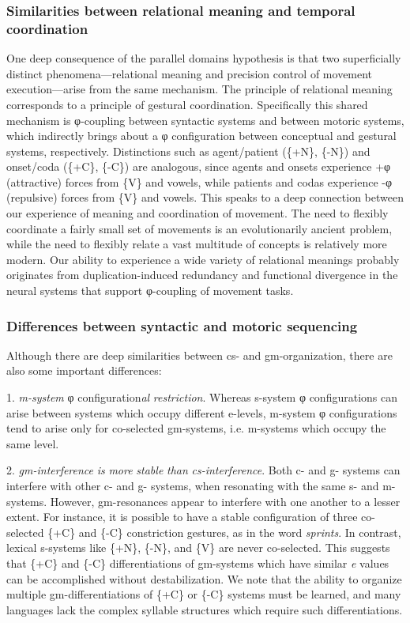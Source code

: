 \subsubsection{Similarities between relational meaning and temporal coordination}

One deep consequence of the parallel domains hypothesis is that two superficially distinct phenomena—relational meaning and precision control of movement execution—arise from the same mechanism. The principle of relational meaning corresponds to a principle of gestural coordination. Specifically this shared mechanism is φ-coupling between syntactic systems and between motoric systems, which indirectly brings about a φ configuration between conceptual and gestural systems, respectively. Distinctions such as agent/patient (\{+N\}, \{-N\}) and onset/coda (\{+C\}, \{-C\}) are analogous, since agents and onsets experience +φ (attractive) forces from \{V\} and vowels, while patients and codas experience -φ (repulsive) forces from \{V\} and vowels. This speaks to a deep connection between our experience of meaning and coordination of movement. The need to flexibly coordinate a fairly small set of movements is an evolutionarily ancient problem, while the need to flexibly relate a vast multitude of concepts is relatively more modern. Our ability to experience a wide variety of relational meanings probably originates from duplication-induced redundancy and functional divergence in the neural systems that support φ-coupling of movement tasks. 

\subsubsection{Differences between syntactic and motoric sequencing} 

Although there are deep similarities between cs- and gm-organization, there are also some important differences: 

1. \textit{m-system} φ configuration\textit{al} \textit{restriction}. Whereas s-system φ configurations can arise between systems which occupy different e-levels, m-system φ configurations tend to arise only for co-selected gm-systems, i.e. m-systems which occupy the same level. 

2. \textit{gm-interference} \textit{is} \textit{more} \textit{stable} \textit{than} \textit{cs-interference}. Both c- and g- systems can interfere with other c- and g- systems, when resonating with the same s- and m- systems. However, gm-resonances appear to interfere with one another to a lesser extent. For instance, it is possible to have a stable configuration of three co-selected \{+C\} and \{-C\} constriction gestures, as in the word \textit{sprints}. In contrast, lexical s-systems like \{+N\}, \{-N\}, and \{V\} are never co-selected. This suggests that \{+C\} and \{-C\} differentiations of gm-systems which have similar \textit{e} values can be accomplished without destabilization. We note that the ability to organize multiple gm-differentiations of \{+C\} or \{-C\} systems must be learned, and many languages lack the complex syllable structures which require such differentiations.

